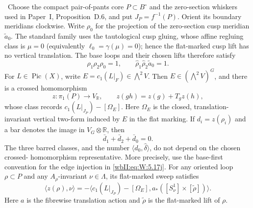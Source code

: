 \begin{lemma}
\label{wbII:lem:picard-crossed-defect}
\ Choose the compact pair-of-pants core $P\subset B^\circ$ and
the zero-section whiskers used in Paper~I, Proposition~D.6, and put
$J_P=f^{-1}(P)$.  Orient its boundary meridians clockwise.  Write
$\rho_0$ for the projection of the zero-section cusp meridian
$\widetilde a_0$.  The standard family uses the tautological cusp
gluing, whose affine regluing class is $\mu=0$ (equivalently
$\ell_0=\gamma(\mu)=0$); hence the flat-marked cusp lift has no vertical
translation.  The base loops and their chosen lifts therefore satisfy
\[
 \rho_1\rho_2\rho_0=1,
 \qquad
 \widehat\rho_1\widehat\rho_2\widetilde a_0=1.
\tag{W.23}\label{wbII:eq:W:5.17g}
\]
For $L\in\operatorname{Pic}(X)$, write
$E=c_1(L|_F)\in\bigwedge^2V$.  Then $E\in(\bigwedge^2V)^G$, and there is a
crossed homomorphism
\[
 z:\pi_1(P)\longrightarrow V_{\mathbb R},\qquad
 z(gh)=z(g)+T_gz(h),
\tag{W.24}\label{wbII:eq:W:5.17h}
\]
whose class records
$c_1(L|_{J_P})-[\Omega_E]$.  Here $\Omega_E$ is the closed, translation-
invariant vertical two-form induced by $E$ in the flat marking.  If
$d_i=z(\rho_i)$ and a bar denotes the image in
$V_G\otimes\mathbb R$, then
\[
 \bar d_1+\bar d_2+\bar d_0=0.
\tag{W.25}\label{wbII:eq:W:5.17i}
\]
The three barred classes, and the number
$\langle d_0,\widehat\delta\rangle$, do not depend on the chosen crossed-
homomorphism representative.  More precisely, use the base-first convention
for the edge injection in \eqref{wbII:eq:W:5.17j}.  For any oriented loop $\rho\subset P$
and any $A_\rho$-invariant $\nu\in\Lambda$, its flat-marked sweep satisfies
\[
 \bigl\langle z(\rho),\nu\bigr\rangle
 =-\bigl\langle c_1(L|_{J_P})-[\Omega_E],
 a_*([S^1_\nu]\times[\widetilde\rho])\bigr\rangle.
\tag{W.26}\label{wbII:eq:W:5.17j'}
\]
Here $a$ is the fibrewise translation action and $\widetilde\rho$ is the
flat-marked lift of $\rho$.
\end{lemma}

